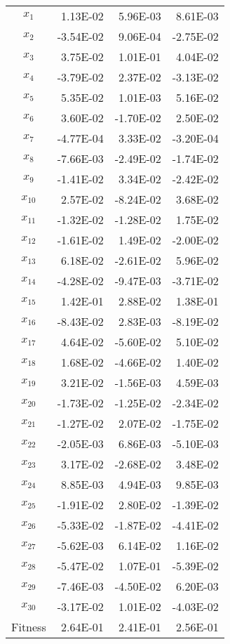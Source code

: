 \begin{table}[htbp]
\begin{tabular}{crrr}
		$x_1$    & 1.13E-02 & 5.96E-03 & 8.61E-03 \\
		$x_2$    & -3.54E-02 & 9.06E-04 & -2.75E-02 \\
		$ x_3 $    & 3.75E-02 & 1.01E-01 & 4.04E-02 \\
		$ x_4 $    & -3.79E-02 & 2.37E-02 & -3.13E-02 \\
		$ x_5 $    & 5.35E-02 & 1.01E-03 & 5.16E-02 \\
		$ x_6 $    & 3.60E-02 & -1.70E-02 & 2.50E-02 \\
		$ x_7 $    & -4.77E-04 & 3.33E-02 & -3.20E-04 \\
		$ x_8 $    & -7.66E-03 & -2.49E-02 & -1.74E-02 \\
		$ x_9 $    & -1.41E-02 & 3.34E-02 & -2.42E-02 \\
		$ x_{10} $   & 2.57E-02 & -8.24E-02 & 3.68E-02 \\
		$ x_{11} $   & -1.32E-02 & -1.28E-02 & 1.75E-02 \\
		$ x_{12} $   & -1.61E-02 & 1.49E-02 & -2.00E-02 \\
		$ x_{13} $   & 6.18E-02 & -2.61E-02 & 5.96E-02 \\
		$ x_{14} $   & -4.28E-02 & -9.47E-03 & -3.71E-02 \\
		$ x_{15} $   & 1.42E-01 & 2.88E-02 & 1.38E-01 \\
		$ x_{16} $   & -8.43E-02 & 2.83E-03 & -8.19E-02 \\
		$ x_{17} $   & 4.64E-02 & -5.60E-02 & 5.10E-02 \\
		$ x_{18} $   & 1.68E-02 & -4.66E-02 & 1.40E-02 \\
		$ x_{19} $   & 3.21E-02 & -1.56E-03 & 4.59E-03 \\
		$ x_{20} $   & -1.73E-02 & -1.25E-02 & -2.34E-02 \\
		$ x_{21} $   & -1.27E-02 & 2.07E-02 & -1.75E-02 \\
		$ x_{22} $   & -2.05E-03 & 6.86E-03 & -5.10E-03 \\
		$ x_{23} $   & 3.17E-02 & -2.68E-02 & 3.48E-02 \\
		$ x_{24} $   & 8.85E-03 & 4.94E-03 & 9.85E-03 \\
		$ x_{25} $   & -1.91E-02 & 2.80E-02 & -1.39E-02 \\
		$ x_{26} $   & -5.33E-02 & -1.87E-02 & -4.41E-02 \\
		$ x_{27} $   & -5.62E-03 & 6.14E-02 & 1.16E-02 \\
		$ x_{28} $   & -5.47E-02 & 1.07E-01 & -5.39E-02 \\
		$ x_{29} $   & -7.46E-03 & -4.50E-02 & 6.20E-03 \\
		$ x_{30} $   & -3.17E-02 & 1.01E-02 & -4.03E-02 \\
		\midrule[1pt]
		Fitness & 2.64E-01 & 2.41E-01 & 2.56E-01 \\
		\bottomrule[1.5pt]
	\end{tabular}%
	\label{tab:addlabel}%
\end{table}%
